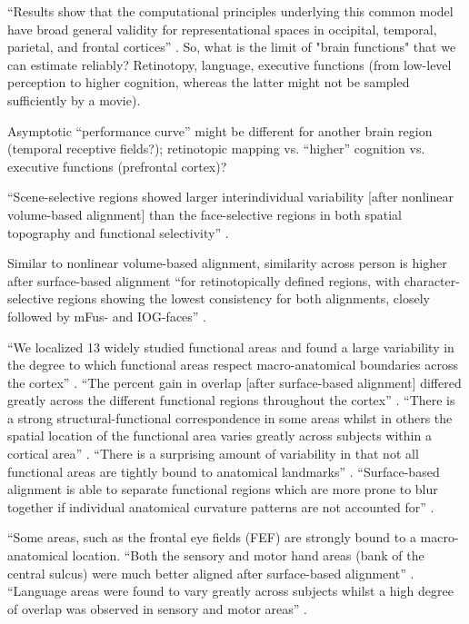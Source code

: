 ``Results show that the computational principles underlying this common model
have broad general validity for representational spaces in occipital, temporal,
parietal, and frontal cortices'' \citep{guntupalli2016model}.
%
So, what is the limit of "brain functions" that we can estimate reliably?
%
Retinotopy, language, executive functions (from low-level perception to higher
cognition, whereas the latter might not be sampled sufficiently by a movie).

%
Asymptotic ``performance curve'' might be different for another brain region
(temporal receptive fields?); retinotopic mapping vs. ``higher'' cognition  vs.
executive functions (prefrontal cortex)?

``Scene-selective regions showed larger interindividual variability [after
nonlinear volume-based alignment] than the face-selective regions in both
spatial topography and functional selectivity'' \citet{zhen2017quantifying}.


Similar to nonlinear volume-based alignment, similarity across person is higher
after surface-based alignment ``for retinotopically defined regions, with
character-selective regions showing the lowest consistency for both alignments,
closely followed by mFus- and IOG-faces'' \citep{rosenke2021probabilistic}.

%
``We localized 13 widely studied functional areas and found a large variability
in the degree to which functional areas respect macro-anatomical boundaries
across the cortex'' \citep{frost2012measuring}.
%
``The percent gain in overlap [after surface-based alignment] differed greatly
across the different functional regions throughout the cortex''
\citep{frost2012measuring}.
%
``There is a strong structural-functional correspondence in some areas whilst in
others the spatial location of the functional area varies greatly across
subjects within a cortical area'' \citep{frost2012measuring}.
%
``There is a surprising amount of variability in that not all functional areas
are tightly bound to anatomical landmarks'' \citep{frost2012measuring}.
%
``Surface-based alignment is able to separate functional regions which are more
prone to blur together if individual anatomical curvature patterns are not
accounted for'' \citep{frost2012measuring}.

%
``Some areas, such as the frontal eye fields (FEF) are strongly bound to a
macro-anatomical location.
%
``Both the sensory and motor hand areas (bank of the central sulcus) were much
better aligned after surface-based alignment'' \citep{frost2012measuring}.
%
``Language areas were found to vary greatly across subjects whilst a high degree
of overlap was observed in sensory and motor areas'' \citep{frost2012measuring}.

